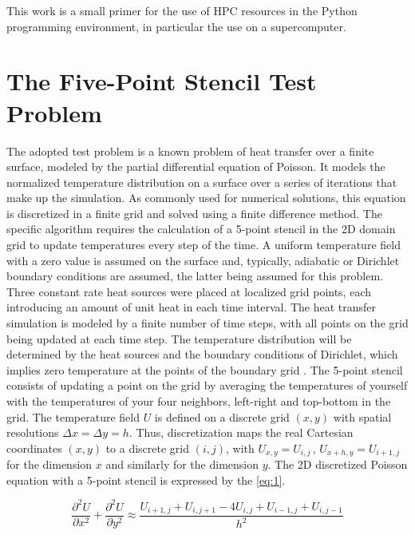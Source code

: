 \documentclass[12pt]{article}
\begin{document}
This work is a small primer for the use of HPC resources in the Python programming environment, in particular the use on a supercomputer.










\section{The Five-Point Stencil Test Problem}
\label{sec:descricao}

The adopted test problem is a known problem of heat transfer over a finite surface, modeled by the partial differential equation of Poisson. It models the normalized temperature distribution on a surface over a series of iterations that make up the simulation. As commonly used for numerical solutions, this equation is discretized in a finite grid and solved using a finite difference method. The specific algorithm requires the calculation of a 5-point stencil in the 2D domain grid \cite{FiniDiff} to update temperatures every step of the time.
A uniform temperature field with a zero value is assumed on the surface and, typically, adiabatic or Dirichlet boundary conditions are assumed, the latter being assumed for this problem. Three constant rate heat sources were placed at localized grid points, each introducing an amount of unit heat in each time interval. The heat transfer simulation is modeled by a finite number of time steps, with all points on the grid being updated at each time step.
The temperature distribution will be determined by the heat sources and the boundary conditions of Dirichlet, which implies zero temperature at the points of the boundary grid \cite{Langtangen2008a}. The 5-point stencil consists of updating a point on the grid by averaging the temperatures of yourself with the temperatures of your four neighbors, left-right and top-bottom in the grid.
The temperature field $ U $ is defined on a discrete grid $ (x, y) $ with spatial resolutions $ \Delta x = \Delta y = h $. Thus, discretization maps the real Cartesian coordinates $ (x, y) $ to a discrete grid $ (i, j) $, with $ U_ {x, y} = U_ {i, j} \,, \, U_ { x + h, y} = U_ {i + 1, j} \, $ for the dimension $ x $ and similarly for the dimension $ y $. The 2D discretized Poisson equation with a 5-point stencil is expressed by the \autoref{eq:1}.

\begin{equation}
  \frac{\partial^2 U}{\partial x^2} +
  \frac{\partial^2 U}{\partial y^2} \approx
  \frac{U_{i+1,j}+U_{i,j+1}-4U_{i,j}+U_{i-1,j}+U_{i,j-1}} {h^2}
  \label{eq:1}
\end{equation}
\end{document}
